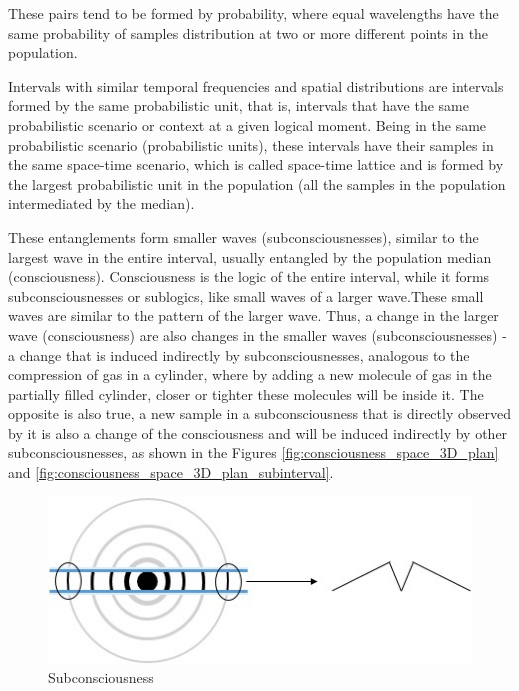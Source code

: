 These pairs tend to be formed by probability, where equal wavelengths have the same probability of samples distribution at two or more different points in the population. 

Intervals with similar temporal frequencies and spatial distributions are intervals formed by the same probabilistic unit, that is, intervals that have the same probabilistic scenario or context at a given logical moment. Being in the same probabilistic scenario (probabilistic units), these intervals have their samples in the same space-time scenario, which is called space-time lattice and is formed by the largest probabilistic unit in the population (all the samples in the population intermediated by the median). 

These entanglements form smaller waves (subconsciousnesses), similar to the largest wave in the entire interval, usually entangled by the population median (consciousness). Consciousness is the logic of the entire interval, while it forms subconsciousnesses or sublogics, like small waves of a larger wave.These small waves are similar to the pattern of the larger wave.  Thus, a change in the larger wave (consciousness) are also changes in the smaller waves (subconsciousnesses) - a change that is induced indirectly by subconsciousnesses, analogous to the compression of gas in a cylinder, where by adding a new molecule of gas in the partially filled cylinder, closer or tighter these molecules will be inside it.  The opposite is also true, a new sample in a subconsciousness that is directly observed by it is also a change of the consciousness and will be induced indirectly by other subconsciousnesses, as shown in the Figures \ref{fig:consciousness_space_3D_plan} and \ref{fig:consciousness_space_3D_plan_subinterval}.
	\begin{figure}[H]
	\caption{Subconsciousness}
	\label{fig:consciousness_subconscious}
	\centering
	\includegraphics[scale=.8]{sections/images/consciousness_subconscious.jpg}
	\end{figure}
	
